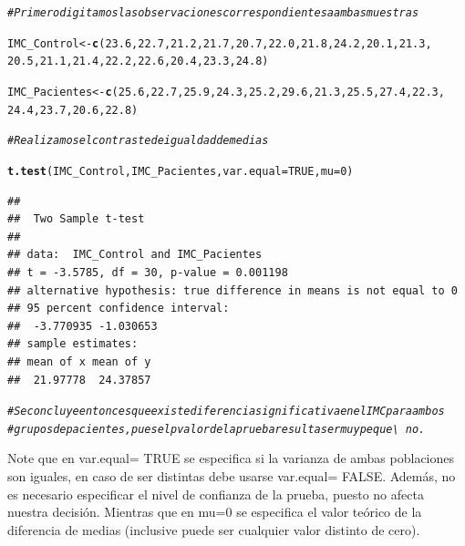 \documentclass[12pt,letterpaper]{article}\usepackage[]{graphicx}\usepackage[]{color}
\makeatletter
\newcommand{\hlnum}[1]{\textcolor[rgb]{0.686,0.059,0.569}{#1}}%
\newcommand{\hlcom}[1]{\textcolor[rgb]{0.678,0.584,0.686}{\textit{#1}}}%
\newcommand{\hlstd}[1]{\textcolor[rgb]{0.345,0.345,0.345}{#1}}%
\newcommand{\hlkwb}[1]{\textcolor[rgb]{0.69,0.353,0.396}{#1}}%
\newcommand{\hlkwc}[1]{\textcolor[rgb]{0.333,0.667,0.333}{#1}}%
\newcommand{\hlkwd}[1]{\textcolor[rgb]{0.737,0.353,0.396}{\textbf{#1}}}%
\newenvironment{kframe}{%
 \def\at@end@of@kframe{}%
 \ifinner\ifhmode%
  \def\at@end@of@kframe{\end{minipage}}%
  \begin{minipage}{\columnwidth}%
 \fi\fi%
 \def\FrameCommand##1{\hskip\@totalleftmargin \hskip-\fboxsep
 \colorbox{shadecolor}{##1}\hskip-\fboxsep
     \hskip-\linewidth \hskip-\@totalleftmargin \hskip\columnwidth}%
 \MakeFramed {\advance\hsize-\width
   \@totalleftmargin\z@ \linewidth\hsize
   \@setminipage}}%
 {\par\unskip\endMakeFramed%
 \at@end@of@kframe}
\newenvironment{knitrout}{}{} %
\makeatother
\begin{document}
\begin{knitrout}
\color{fgcolor}\begin{kframe}
\begin{alltt}
\hlcom{# Primero digitamos las observaciones correspondientes a ambas muestras}

\hlstd{IMC_Control} \hlkwb{<-} \hlkwd{c}\hlstd{(}\hlnum{23.6}\hlstd{,} \hlnum{22.7}\hlstd{,} \hlnum{21.2}\hlstd{,} \hlnum{21.7}\hlstd{,} \hlnum{20.7}\hlstd{,} \hlnum{22.0}\hlstd{,} \hlnum{21.8}\hlstd{,} \hlnum{24.2}\hlstd{,} \hlnum{20.1}\hlstd{,} \hlnum{21.3}\hlstd{,}
                 \hlnum{20.5}\hlstd{,} \hlnum{21.1}\hlstd{,} \hlnum{21.4}\hlstd{,} \hlnum{22.2}\hlstd{,} \hlnum{22.6}\hlstd{,} \hlnum{20.4}\hlstd{,} \hlnum{23.3}\hlstd{,} \hlnum{24.8}\hlstd{)}

\hlstd{IMC_Pacientes} \hlkwb{<-} \hlkwd{c}\hlstd{(}\hlnum{25.6}\hlstd{,} \hlnum{22.7}\hlstd{,} \hlnum{25.9}\hlstd{,} \hlnum{24.3}\hlstd{,} \hlnum{25.2}\hlstd{,} \hlnum{29.6}\hlstd{,} \hlnum{21.3}\hlstd{,} \hlnum{25.5}\hlstd{,} \hlnum{27.4}\hlstd{,} \hlnum{22.3}\hlstd{,}
                   \hlnum{24.4}\hlstd{,} \hlnum{23.7}\hlstd{,} \hlnum{20.6}\hlstd{,} \hlnum{22.8}\hlstd{)}

\hlcom{# Realizamos el contraste de igualdad de medias }

\hlkwd{t.test}\hlstd{(IMC_Control, IMC_Pacientes,} \hlkwc{var.equal}\hlstd{=}\hlnum{TRUE}\hlstd{,} \hlkwc{mu}\hlstd{=}\hlnum{0}\hlstd{)}
\end{alltt}
\begin{verbatim}
## 
## 	Two Sample t-test
## 
## data:  IMC_Control and IMC_Pacientes
## t = -3.5785, df = 30, p-value = 0.001198
## alternative hypothesis: true difference in means is not equal to 0
## 95 percent confidence interval:
##  -3.770935 -1.030653
## sample estimates:
## mean of x mean of y 
##  21.97778  24.37857
\end{verbatim}
\begin{alltt}
\hlcom{# Se concluye entonces que existe diferencia significativa en el IMC para ambos }
\hlcom{# grupos de pacientes, pues el p valor de la prueba resulta ser muy peque\textbackslash{}~no. }
\end{alltt}
\end{kframe}
\end{knitrout}

Note que en var.equal= TRUE se especifica si la varianza de ambas poblaciones son iguales, en caso de ser distintas debe usarse var.equal= FALSE. Adem\'as, no es necesario especificar el nivel de confianza de la prueba, puesto no afecta nuestra decisi\'on. Mientras que en mu=0 se especifica el valor te\'orico de la diferencia de medias (inclusive puede ser cualquier valor distinto de cero).\\
\end{document}
